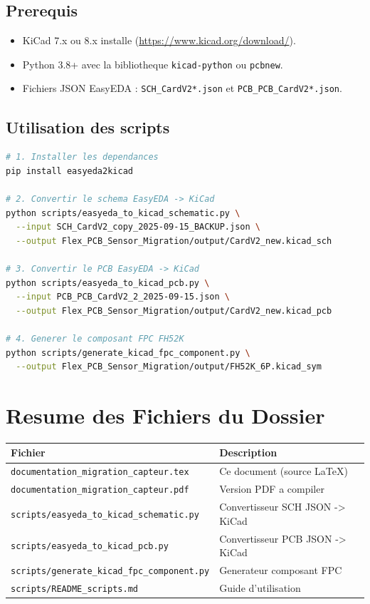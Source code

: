 \documentclass[12pt,a4paper]{article}
\begin{document}
\subsection{Prerequis}

\begin{itemize}
  \item KiCad 7.x ou 8.x installe (\url{https://www.kicad.org/download/}).
  \item Python 3.8+ avec la bibliotheque \texttt{kicad-python} ou \texttt{pcbnew}.
  \item Fichiers JSON EasyEDA : \texttt{SCH\_CardV2*.json} et \texttt{PCB\_PCB\_CardV2*.json}.
\end{itemize}

\subsection{Utilisation des scripts}

\begin{lstlisting}[language=bash,caption={Utilisation des scripts Python}]
# 1. Installer les dependances
pip install easyeda2kicad

# 2. Convertir le schema EasyEDA -> KiCad
python scripts/easyeda_to_kicad_schematic.py \
  --input SCH_CardV2_copy_2025-09-15_BACKUP.json \
  --output Flex_PCB_Sensor_Migration/output/CardV2_new.kicad_sch

# 3. Convertir le PCB EasyEDA -> KiCad
python scripts/easyeda_to_kicad_pcb.py \
  --input PCB_PCB_CardV2_2_2025-09-15.json \
  --output Flex_PCB_Sensor_Migration/output/CardV2_new.kicad_pcb

# 4. Generer le composant FPC FH52K
python scripts/generate_kicad_fpc_component.py \
  --output Flex_PCB_Sensor_Migration/output/FH52K_6P.kicad_sym
\end{lstlisting}

\section{Resume des Fichiers du Dossier}

\begin{center}
\begin{tabular}{ll}
\toprule
\textbf{Fichier} & \textbf{Description} \\
\midrule
\texttt{documentation\_migration\_capteur.tex} & Ce document (source LaTeX) \\
\texttt{documentation\_migration\_capteur.pdf} & Version PDF a compiler \\
\texttt{scripts/easyeda\_to\_kicad\_schematic.py} & Convertisseur SCH JSON -> KiCad \\
\texttt{scripts/easyeda\_to\_kicad\_pcb.py} & Convertisseur PCB JSON -> KiCad \\
\texttt{scripts/generate\_kicad\_fpc\_component.py} & Generateur composant FPC \\
\texttt{scripts/README\_scripts.md} & Guide d'utilisation \\
\bottomrule
\end{tabular}
\end{center}
\end{document}
